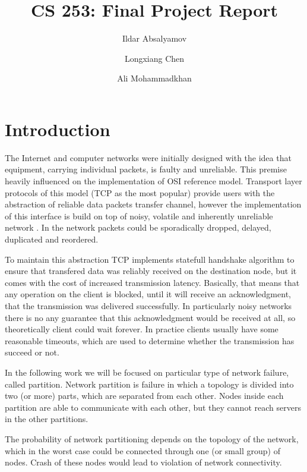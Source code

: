 \documentclass[a4paper]{article}
\title{CS 253: Final Project Report}
\author{Ildar Absalyamov \and Longxiang Chen \and Ali Mohammadkhan}
\begin{document}
\maketitle

\section{Introduction}

The Internet and computer networks were initially designed with the idea that equipment, carrying individual packets, is faulty and unreliable.
This premise heavily influenced on the implementation of OSI reference model.
Transport layer protocols of this model (TCP as the most popular) provide users with the abstraction of reliable data packets transfer channel, however the implementation of this interface is build on top of noisy, volatile and inherently unreliable network \cite{deutsch1992eight}.
In the network packets could be sporadically dropped, delayed, duplicated and reordered.

To maintain this abstraction TCP implements statefull handshake algorithm to ensure that transfered data was reliably received on the destination node, but it comes with the cost of increased transmission latency.
Basically, that means that any operation on the client is blocked, until it will receive an acknowledgment, that the transmission was delivered successfully. 
In particularly noisy networks there is no any guarantee that this acknowledgment would be received at all, so theoretically client could wait forever.
In practice clients usually have some reasonable timeouts, which are used to determine whether the transmission has succeed or not.

In the following work we will be focused on particular type of network failure, called partition.
Network partition is failure in which a topology is divided into two (or more) parts, which are separated from each other.
Nodes inside each partition are able to communicate with each other, but they cannot reach servers in the other partitions.

The probability of network partitioning depends on the topology of the network, which in the worst case could be connected through one (or small group) of nodes.
Crash of these nodes would lead to violation of network connectivity.
\end{document}
